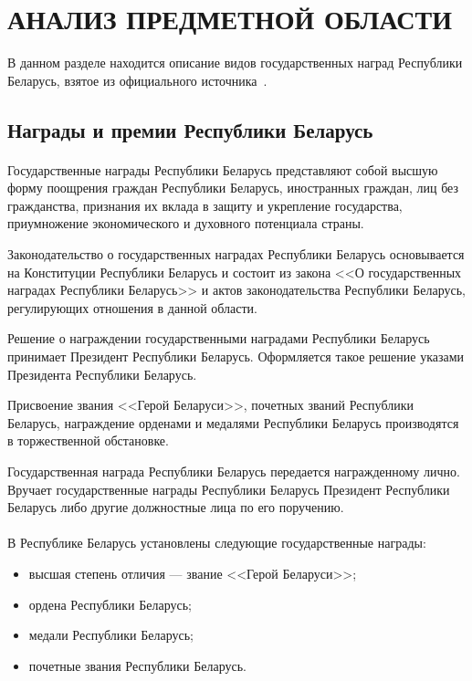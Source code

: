 \section[Анализ предметной области]{АНАЛИЗ ПРЕДМЕТНОЙ ОБЛАСТИ}

В данном разделе находится описание видов государственных наград 
Республики Беларусь, взятое из официального источника~\cite{bel_orders}.

\subsection{Награды и премии Республики Беларусь}

\paragraph{}
Государственные награды Республики Беларусь представляют собой
высшую форму поощрения граждан Республики Беларусь, иностранных граждан,
лиц без гражданства, признания их вклада в защиту и укрепление государства,
приумножение экономического и духовного потенциала страны.

Законодательство о государственных наградах Республики Беларусь основывается
на Конституции Республики Беларусь и состоит из закона
<<О государственных наградах Республики Беларусь>> и актов законодательства
Республики Беларусь, регулирующих отношения в данной области.

Решение о награждении государственными наградами Республики Беларусь
принимает Президент Республики Беларусь.
Оформляется такое решение указами Президента Республики Беларусь.

Присвоение звания <<Герой Беларуси>>, почетных званий Республики Беларусь,
награждение орденами и медалями Республики Беларусь производятся
в торжественной обстановке.

Государственная награда Республики Беларусь передается награжденному лично.
Вручает государственные награды Республики Беларусь
Президент Республики Беларусь либо другие должностные лица по его поручению. 

\paragraph{}
В Республике Беларусь установлены следующие государственные награды:
\begin{itemize}
\item высшая степень отличия --- звание <<Герой Беларуси>>;
\item ордена Республики Беларусь;
\item медали Республики Беларусь;
\item почетные звания Республики Беларусь.
\end{itemize}

